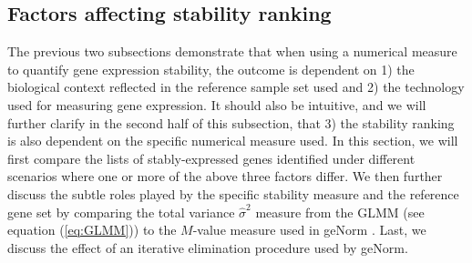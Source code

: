 \documentclass[11pt, a4paper]{article}
\begin{document}
\subsection{Factors affecting stability ranking}\label{section:stabilityMeasure}
The previous two subsections demonstrate that when using a numerical measure
to quantify gene expression stability, the outcome is dependent on 1) the
biological context reflected in the reference sample set used and 2) the
technology used for measuring gene expression. It should also be intuitive,
and we will further clarify in the second half of this subsection, that 3) the
stability ranking is also dependent on the specific numerical measure used.
In this section, we will first compare the lists of stably-expressed genes
identified under different scenarios where one or more of the above three
factors differ.  We then further discuss the subtle roles played by the
specific stability measure and the reference gene set by comparing the total
variance $\hat\sigma^2$ measure from the GLMM (see equation (\ref{eq:GLMM}))
to the $M$-value measure used in geNorm \citep{vandesompele2002accurate}.
Last, we discuss the effect of an iterative elimination procedure used by
geNorm.
\end{document}
